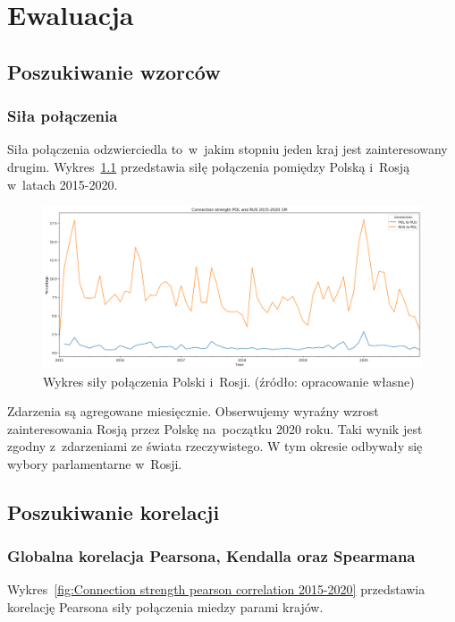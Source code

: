 \documentclass[11pt]{report}
\begin{document}
    \chapter{Ewaluacja}\label{ch:ewaluacja}


    \section{Poszukiwanie wzorców}\label{sec:poszukiwanie-wzorców}

    \subsection{Siła połączenia}
    Siła połączenia odzwierciedla to~w~jakim stopniu jeden kraj jest zainteresowany drugim.
    Wykres~\ref{fig:POL and RUS connection 1M} przedstawia siłę połączenia pomiędzy Polską i~Rosją w~latach 2015-2020.

    \begin{figure}[!ht]
        \centering
        \includegraphics[width=\linewidth]{../spade_proto/figures/symmetry/POL and RUSconnection 1M.png}
        \caption{Wykres siły połączenia Polski i~Rosji. (źródło: opracowanie własne)}
        \label{fig:POL and RUS connection 1M}
    \end{figure}

    Zdarzenia są agregowane miesięcznie.
    Obserwujemy wyraźny wzrost zainteresowania Rosją przez Polskę na~początku 2020 roku.
    Taki wynik jest zgodny z~zdarzeniami ze świata rzeczywistego.
    W tym okresie odbywały się wybory parlamentarne w~Rosji.


    \section{Poszukiwanie korelacji}\label{sec:poszukiwanie-korelacji}

    \subsection{Globalna korelacja Pearsona, Kendalla oraz Spearmana}
    Wykres~\ref{fig:Connection strength pearson correlation 2015-2020} przedstawia korelację Pearsona siły połączenia miedzy parami krajów.
\end{document}
